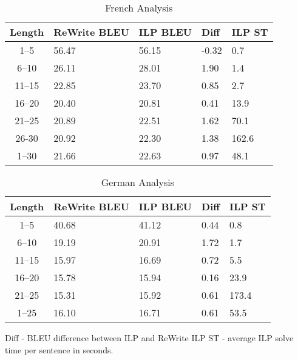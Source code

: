 \begin{table}[tp]
  \centering
  \begin{tabular}{|c|l|l|l|l|}
    \hline
    Length & ReWrite BLEU & ILP BLEU & Diff & ILP ST \\
    \hline
    1--5 & 56.47 & 56.15 & -0.32 & 0.7 \\
    6--10 & 26.11 & 28.01 & 1.90 & 1.4 \\
    11--15 & 22.85 & 23.70 & 0.85 & 2.7 \\
    16--20 & 20.40 & 20.81 & 0.41 & 13.9 \\
    21--25 & 20.89 & 22.51 & 1.62 & 70.1 \\
    26-30 & 20.92 & 22.30 & 1.38 & 162.6 \\
    \hline 
    1--30 & 21.66 & 22.63 & 0.97 & 48.1 \\
    \hline
  \end{tabular}
  \caption{French Analysis}
  \label{tab:french-analysis}
\end{table}

\begin{table}[tp]
  \centering
  \begin{tabular}{|c|l|l|l|l|}
    \hline
    Length & ReWrite BLEU & ILP BLEU & Diff & ILP ST \\
    \hline
    1--5 & 40.68 & 41.12 & 0.44 & 0.8 \\
    6--10 & 19.19 & 20.91 & 1.72 & 1.7 \\
    11--15 & 15.97 & 16.69 & 0.72 & 5.5 \\
    16--20 & 15.78 & 15.94 & 0.16 & 23.9 \\
    21--25 & 15.31 & 15.92 & 0.61 & 173.4 \\
    \hline 
    1--25 & 16.10 & 16.71 & 0.61 & 53.5 \\
    \hline
  \end{tabular}
  \caption{German Analysis}
  \label{tab:german-analysis}
\end{table}

Diff - BLEU difference between ILP and ReWrite
ILP ST - average ILP solve time per sentence in seconds.



